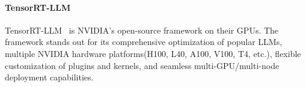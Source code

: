 \paragraph{TensorRT-LLM}
TensorRT-LLM~\citep{NVIDIA2024tensorrt-llm} is NVIDIA's open-source framework on their GPUs. The framework stands out for its comprehensive optimization of popular LLMs, multiple NVIDIA hardware platforms(H100, L40, A100, V100, T4, etc.), flexible customization of plugins and kernels, and seamless multi-GPU/multi-node deployment capabilities. 